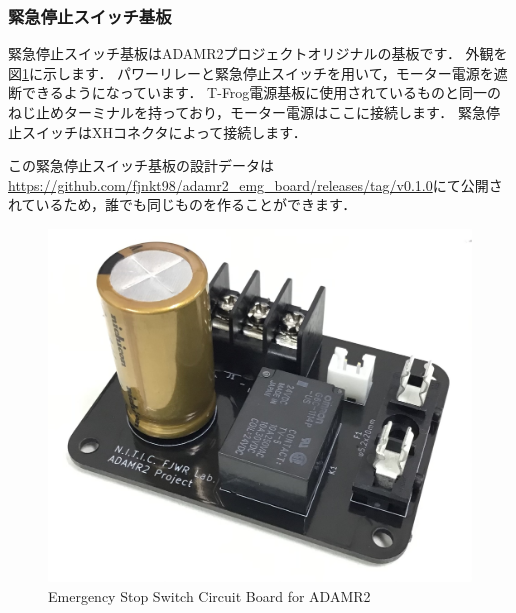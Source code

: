 \documentclass[{../../master}]{subfiles}
\begin{document}
  \subsubsection{緊急停止スイッチ基板}
  緊急停止スイッチ基板はADAMR2プロジェクトオリジナルの基板です．
  外観を図\ref{fig:emergency_stop_switch_circuit}に示します．
  パワーリレーと緊急停止スイッチを用いて，モーター電源を遮断できるようになっています．
  T-Frog電源基板に使用されているものと同一のねじ止めターミナルを持っており，モーター電源はここに接続します．
  緊急停止スイッチはXHコネクタによって接続します．

  この緊急停止スイッチ基板の設計データは\url{https://github.com/fjnkt98/adamr2_emg_board/releases/tag/v0.1.0}にて公開されているため，誰でも同じものを作ることができます．

  \begin{figure}[ht]
    \centering
    \includegraphics[width=65truemm]{images/emergency_stop_switch_circuit.jpg}
    \caption{Emergency Stop Switch Circuit Board for ADAMR2}
    \label{fig:emergency_stop_switch_circuit}
  \end{figure}
\end{document}
